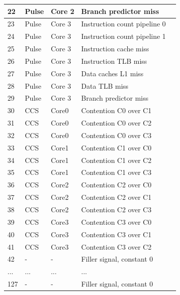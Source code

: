 \begin{table}[H]
\begin{footnotesize}
\begin{tabular}{|l|l|l|l|l|}
\hline 
22 & Pulse & Core 2 &  Branch predictor miss \\
\hline 
23 & Pulse & Core 3 &  Instruction count pipeline 0 \\
\hline 
24 & Pulse & Core 3 &  Instruction count pipeline 1 \\
\hline 
25 & Pulse & Core 3 &  Instruction cache miss \\
\hline 
26 & Pulse & Core 3 &  Instruction TLB miss \\
\hline 
27 & Pulse & Core 3 &  Data caches L1 miss \\
\hline 
28 & Pulse & Core 3 &  Data TLB miss \\
\hline 
29 & Pulse & Core 3 &  Branch predictor miss \\
\hline 
30 & CCS & Core0 &  Contention C0 over C1\\
\hline 
31 & CCS & Core0 &  Contention C0 over C2\\
\hline 
32 & CCS & Core0 &  Contention C0 over C3\\
\hline 
33 & CCS & Core1 &  Contention C1 over C0\\
\hline 
34 & CCS & Core1 &  Contention C1 over C2\\
\hline 
35 & CCS & Core1 &  Contention C1 over C3\\
\hline 
36 & CCS & Core2 &  Contention C2 over C0\\
\hline 
37 & CCS & Core2 &  Contention C2 over C1\\
\hline 
38 & CCS & Core2 &  Contention C2 over C3\\
\hline 
39 & CCS & Core3 &  Contention C3 over C0\\
\hline 
40 & CCS & Core3 &  Contention C3 over C1\\
\hline 
41 & CCS & Core3 &  Contention C3 over C2\\
\hline 
42 & - & - &   Filler signal, constant 0 \\
\hline 
... & ... & ... &  ... \\

\hline 
127 & - & - &   Filler signal, constant 0 \\
\hline 
	\end{tabular}
	\end{footnotesize}
\end{table}

